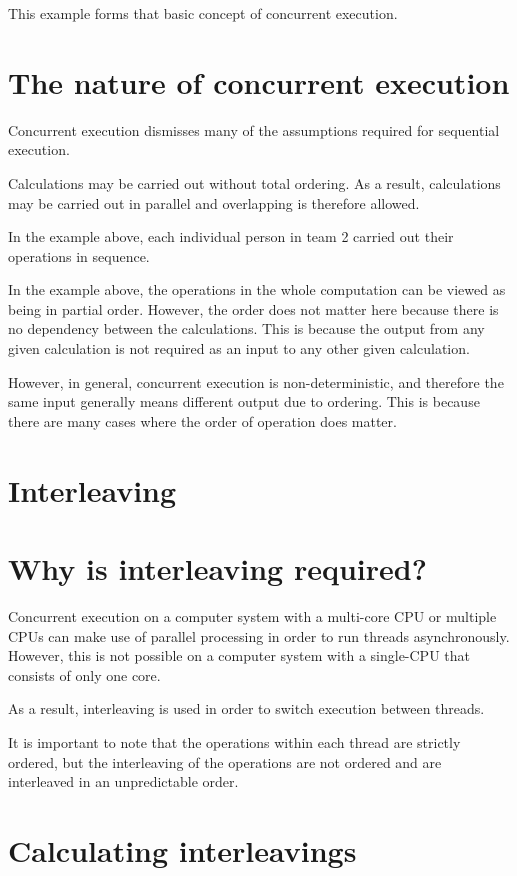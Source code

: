 \documentclass[a4paper]{systems-software}
\begin{document}
This example forms that basic concept of concurrent execution.


\section*{The nature of concurrent execution}

Concurrent execution dismisses many of the assumptions required for sequential execution.

Calculations may be carried out without total ordering. As a result, calculations may be carried out in parallel and overlapping is therefore allowed.

In the example above, each individual person in team 2 carried out their operations in sequence.

In the example above, the operations in the whole computation can be viewed as being in partial order. However, the order does not matter here because there is no dependency between the calculations. This is because the output from any given calculation is not required as an input to any other given calculation.

However, in general, concurrent execution is non-deterministic, and therefore the same input generally means different output due to ordering. This is because there are many cases where the order of operation does matter.


\section{Interleaving}

\section*{Why is interleaving required?}

Concurrent execution on a computer system with a multi-core CPU or multiple CPUs can make use of parallel processing in order to run threads asynchronously. However, this is not possible on a computer system with a single-CPU that consists of only one core.

As a result, interleaving is used in order to switch execution between threads.

It is important to note that the operations within each thread are strictly ordered, but the interleaving of the operations are not ordered and are interleaved in an unpredictable order.


\section*{Calculating interleavings}
\end{document}
